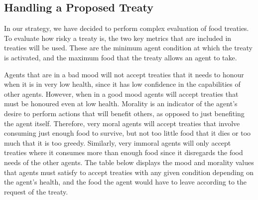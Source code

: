\subsection{Handling a Proposed Treaty}
In our strategy, we have decided to perform complex evaluation of food treaties. To evaluate how risky a treaty is, the two key metrics that are included in treaties will be used. These are the minimum agent condition at which the treaty is activated, and the maximum food that the treaty allows an agent to take.\par
Agents that are in a bad mood will not accept treaties that it needs to honour when it is in very low health, since it  has low confidence in the capabilities of other agents. However, when in a good mood agents will accept treaties that must be honoured even at low health. Morality is an indicator of the agent’s desire to perform actions that will benefit others, as opposed to just benefiting the agent itself. Therefore, very moral agents will accept treaties that involve consuming just enough food to survive, but not too little food that it dies or too much that it is too greedy. Similarly, very immoral agents will only accept treaties where it consumes more than enough food since it disregards the food needs of the other agents. The table below displays the mood and morality values that agents must satisfy to accept treaties with any given condition depending on the agent’s health, and the food the agent would have to leave according to the request of the treaty.
